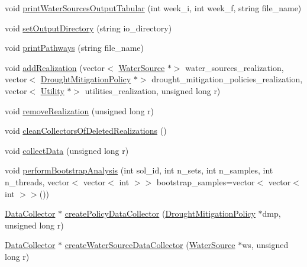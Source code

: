 \begin{DoxyCompactItemize}
\item 
void \mbox{\hyperlink{classMasterDataCollector_a77dd707b686d936118cd4e940156754f}{print\+Water\+Sources\+Output\+Tabular}} (int week\+\_\+i, int week\+\_\+f, string file\+\_\+name)
\item 
void \mbox{\hyperlink{classMasterDataCollector_a6ef49bd511d89217e9a5b0626b3499c4}{set\+Output\+Directory}} (string io\+\_\+directory)
\item 
void \mbox{\hyperlink{classMasterDataCollector_a966681d5219d11d0c6882522cd2ddd20}{print\+Pathways}} (string file\+\_\+name)
\item 
void \mbox{\hyperlink{classMasterDataCollector_aadb319947e62055428b18339d559a0ef}{add\+Realization}} (vector$<$ \mbox{\hyperlink{classWaterSource}{Water\+Source}} $\ast$$>$ water\+\_\+sources\+\_\+realization, vector$<$ \mbox{\hyperlink{classDroughtMitigationPolicy}{Drought\+Mitigation\+Policy}} $\ast$$>$ drought\+\_\+mitigation\+\_\+policies\+\_\+realization, vector$<$ \mbox{\hyperlink{classUtility}{Utility}} $\ast$$>$ utilities\+\_\+realization, unsigned long r)
\item 
void \mbox{\hyperlink{classMasterDataCollector_a5cbae3837d5f32ea3469a55f025692f5}{remove\+Realization}} (unsigned long r)
\item 
void \mbox{\hyperlink{classMasterDataCollector_a92683f7c5ec82e45259fe403be285149}{clean\+Collectors\+Of\+Deleted\+Realizations}} ()
\item 
void \mbox{\hyperlink{classMasterDataCollector_a522fd42f6cf612e32691cf11a807045c}{collect\+Data}} (unsigned long r)
\item 
void \mbox{\hyperlink{classMasterDataCollector_acbf0e8a8f30e483e504d756883d45cf0}{perform\+Bootstrap\+Analysis}} (int sol\+\_\+id, int n\+\_\+sets, int n\+\_\+samples, int n\+\_\+threads, vector$<$ vector$<$ int $>$$>$ bootstrap\+\_\+samples=vector$<$ vector$<$ int $>$$>$())
\item 
\mbox{\hyperlink{classDataCollector}{Data\+Collector}} $\ast$ \mbox{\hyperlink{classMasterDataCollector_a0b1606181cad15c58918deef52618885}{create\+Policy\+Data\+Collector}} (\mbox{\hyperlink{classDroughtMitigationPolicy}{Drought\+Mitigation\+Policy}} $\ast$dmp, unsigned long r)
\item 
\mbox{\hyperlink{classDataCollector}{Data\+Collector}} $\ast$ \mbox{\hyperlink{classMasterDataCollector_af14c96886904b8b044484cb0533fc43d}{create\+Water\+Source\+Data\+Collector}} (\mbox{\hyperlink{classWaterSource}{Water\+Source}} $\ast$ws, unsigned long r)
\item 
$$
\end{DoxyCompactItemize}
